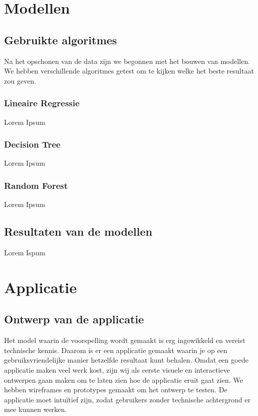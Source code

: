 \documentclass{article}
\begin{document}
\newpage
\section{Modellen}

\subsection{Gebruikte algoritmes}
Na het opschonen van de data zijn we begonnen met het bouwen van modellen. We hebben verschillende algoritmes getest om te kijken welke het beste resultaat zou geven.

\subsubsection{Lineaire Regressie}
Lorem Ipsum

\subsubsection{Decision Tree}
Lorem Ipsum

\subsubsection{Random Forest}
Lorem Ipsum

\subsection{Resultaten van de modellen}
Lorem Ispum

\newpage
\section{Applicatie}

\subsection{Ontwerp van de applicatie}
Het model waarin de voorspelling wordt gemaakt is erg ingewikkeld en vereist technische kennis. Daarom is er een applicatie gemaakt waarin je op een gebruiksvriendelijke manier hetzelfde resultaat kunt behalen. Omdat een goede applicatie maken veel werk kost, zijn wij als eerste visuele en interactieve ontwerpen gaan maken om te laten zien hoe de applicatie eruit gaat zien. We hebben wireframes en prototypes gemaakt om het ontwerp te testen. De applicatie moet intuïtief zijn, zodat gebruikers zonder technische achtergrond er mee kunnen werken.
\end{document}
